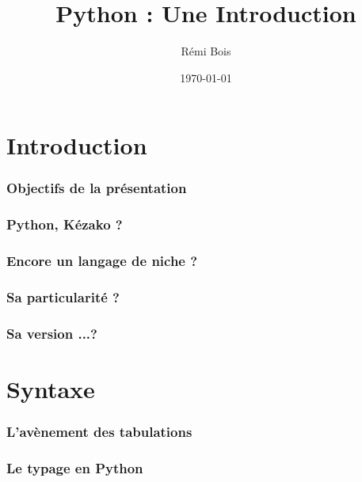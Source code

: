 \documentclass{beamer}
\title{Python : Une Introduction}
\institute{ASCII}
\author{Rémi Bois}
\date{\today}
\begin{document}
\begin{frame}
  \maketitle
\end{frame}

\section{Introduction}
\label{sec:intro}


\begin{frame}
  \frametitle{Objectifs de la présentation}
\end{frame}

\begin{frame}
  \frametitle{Python, Kézako ?}
\end{frame}

\begin{frame}
  \frametitle{Encore un langage de niche ?}
\end{frame}

\begin{frame}
  \frametitle{Sa particularité ?}
\end{frame}

\begin{frame}
  \frametitle{Sa version ...?}
\end{frame}

\section{Syntaxe}
\label{sec:syntax}

\begin{frame}
  \frametitle{L'avènement des tabulations}
\end{frame}

\begin{frame}
  \frametitle{Le typage en Python}
\end{frame}
\end{document}
